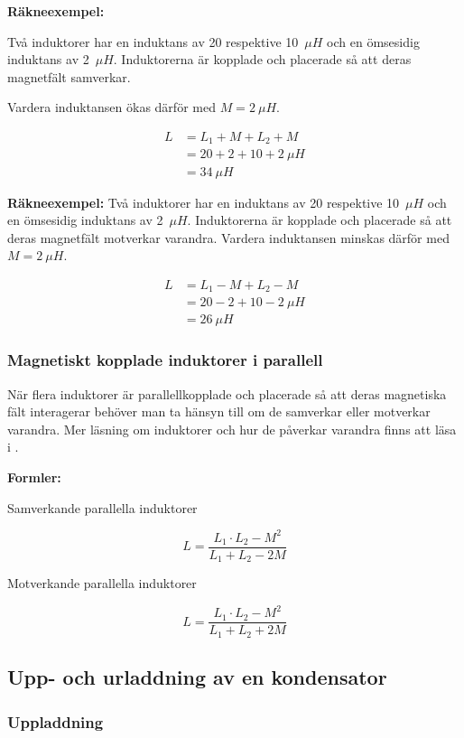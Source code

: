 \textbf{Räkneexempel:}

Två induktorer har en induktans av 20 respektive 10~\(\mu H\) och en ömsesidig
induktans av 2~\(\mu H\).
Induktorerna är kopplade och placerade så att deras magnetfält samverkar.

Vardera induktansen ökas därför med \(M = 2\ \mu H\).

\begin{align*}
  L &= L_1 + M + L_2 + M \\
  &= 20 + 2 + 10 + 2\ \mu H \\
  &= 34\ \mu H
\end{align*}

\textbf{Räkneexempel:}
Två induktorer har en induktans av 20 respektive 10~\(\mu H\) och en ömsesidig
induktans av 2~\(\mu H\).
Induktorerna är kopplade och placerade så att deras magnetfält motverkar varandra.
Vardera induktansen minskas därför med \(M = 2\ \mu H\).

\begin{align*}
  L &= L_1 - M + L_2 - M \\
  & = 20 - 2 + 10 - 2\ \mu H \\
  &= 26\ \mu H
\end{align*}

\subsubsection{Magnetiskt kopplade induktorer i parallell}
När flera induktorer är parallellkopplade och placerade så att deras magnetiska
fält interagerar behöver man ta hänsyn till om de samverkar eller motverkar varandra.
Mer läsning om induktorer och hur de påverkar varandra finns att läsa i
\cite{letrafo}.

\textbf{Formler:}

Samverkande parallella induktorer

\[L = \frac{L_1 \cdot L_2 - M^2}{L_1 + L_2 - 2M}\]

Motverkande parallella induktorer

\[L = \frac{L_1 \cdot L_2 - M^2}{L_1 + L_2 + 2M}\]

\subsection{Upp- och urladdning av en kondensator}

\subsubsection{Uppladdning}

